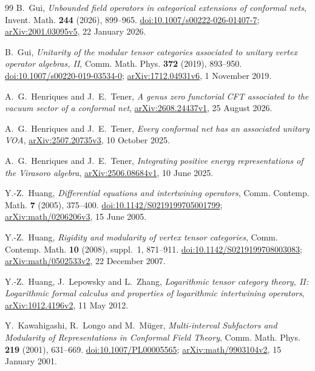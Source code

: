 \begin{thebibliography}{99}
B.~Gui,
\emph{Unbounded field operators in categorical extensions of conformal nets},
Invent. Math. \textbf{244} (2026), 899--965.
\href{https://doi.org/10.1007/s00222-026-01407-7}{doi:10.1007/s00222-026-01407-7};
\href{https://arxiv.org/abs/2001.03095v5}{arXiv:2001.03095v5},
22 January 2026.

B.~Gui,
\emph{Unitarity of the modular tensor categories associated to unitary vertex operator algebras, II},
Comm. Math. Phys. \textbf{372} (2019), 893--950.
\href{https://doi.org/10.1007/s00220-019-03534-0}{doi:10.1007/s00220-019-03534-0};
\href{https://arxiv.org/abs/1712.04931v6}{arXiv:1712.04931v6},
1 November 2019.

A.~G.~Henriques and J.~E.~Tener,
\emph{A genus zero functorial CFT associated to the vacuum sector of a conformal net},
\href{https://arxiv.org/abs/2608.24437v1}{arXiv:2608.24437v1},
25 August 2026.

A.~G.~Henriques and J.~E.~Tener,
\emph{Every conformal net has an associated unitary VOA},
\href{https://arxiv.org/abs/2507.20735v3}{arXiv:2507.20735v3},
10 October 2025.

A.~G.~Henriques and J.~E.~Tener,
\emph{Integrating positive energy representations of the Virasoro algebra},
\href{https://arxiv.org/abs/2506.08684v1}{arXiv:2506.08684v1},
10 June 2025.

Y.-Z.~Huang,
\emph{Differential equations and intertwining operators},
Comm. Contemp. Math. \textbf{7} (2005), 375--400.
\href{https://doi.org/10.1142/S0219199705001799}{doi:10.1142/S0219199705001799};
\href{https://arxiv.org/abs/math/0206206v3}{arXiv:math/0206206v3},
15 June 2005.

Y.-Z.~Huang,
\emph{Rigidity and modularity of vertex tensor categories},
Comm. Contemp. Math. \textbf{10} (2008), suppl.~1, 871--911.
\href{https://doi.org/10.1142/S0219199708003083}{doi:10.1142/S0219199708003083};
\href{https://arxiv.org/abs/math/0502533v2}{arXiv:math/0502533v2},
22 December 2007.

Y.-Z.~Huang, J.~Lepowsky and L.~Zhang,
\emph{Logarithmic tensor category theory, II: Logarithmic formal calculus and properties of logarithmic intertwining operators},
\href{https://arxiv.org/abs/1012.4196v2}{arXiv:1012.4196v2},
11 May 2012.

Y.~Kawahigashi, R.~Longo and M.~M\"uger,
\emph{Multi-interval Subfactors and Modularity of Representations in Conformal Field Theory},
Comm. Math. Phys. \textbf{219} (2001), 631--669.
\href{https://doi.org/10.1007/PL00005565}{doi:10.1007/PL00005565};
\href{https://arxiv.org/abs/math/9903104v2}{arXiv:math/9903104v2},
15 January 2001.


\end{thebibliography}
